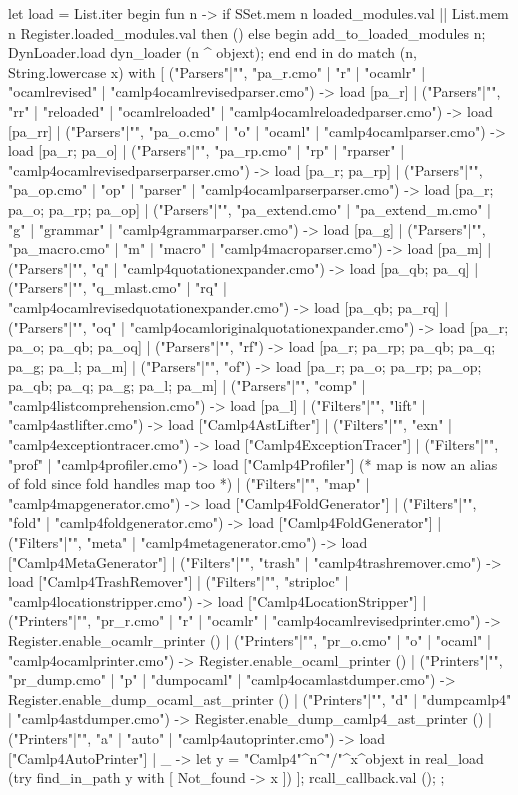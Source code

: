 \begin{ocamlcode}
  let load = List.iter begin fun n ->
    if SSet.mem n loaded_modules.val || List.mem n Register.loaded_modules.val then ()
    else begin
      add_to_loaded_modules n;
      DynLoader.load dyn_loader (n ^ objext);
    end
  end in
  do {
    match (n, String.lowercase x) with
    [ ("Parsers"|"", "pa_r.cmo"      | "r"  | "ocamlr" | "ocamlrevised" | "camlp4ocamlrevisedparser.cmo") -> load [pa_r]
    | ("Parsers"|"", "rr" | "reloaded" | "ocamlreloaded" | "camlp4ocamlreloadedparser.cmo") -> load [pa_rr]
    | ("Parsers"|"", "pa_o.cmo"      | "o"  | "ocaml" | "camlp4ocamlparser.cmo") -> load [pa_r; pa_o]
    | ("Parsers"|"", "pa_rp.cmo"     | "rp" | "rparser" | "camlp4ocamlrevisedparserparser.cmo") -> load [pa_r; pa_rp]
    | ("Parsers"|"", "pa_op.cmo"     | "op" | "parser" | "camlp4ocamlparserparser.cmo") -> load [pa_r; pa_o; pa_rp; pa_op]
    | ("Parsers"|"", "pa_extend.cmo" | "pa_extend_m.cmo" | "g" | "grammar" | "camlp4grammarparser.cmo") -> load [pa_g]
    | ("Parsers"|"", "pa_macro.cmo"  | "m"  | "macro" | "camlp4macroparser.cmo") -> load [pa_m]
    | ("Parsers"|"", "q" | "camlp4quotationexpander.cmo") -> load [pa_qb; pa_q]
    | ("Parsers"|"", "q_mlast.cmo" | "rq" | "camlp4ocamlrevisedquotationexpander.cmo") -> load [pa_qb; pa_rq]
    | ("Parsers"|"", "oq" | "camlp4ocamloriginalquotationexpander.cmo") -> load [pa_r; pa_o; pa_qb; pa_oq]
    | ("Parsers"|"", "rf") -> load [pa_r; pa_rp; pa_qb; pa_q; pa_g; pa_l; pa_m]
    | ("Parsers"|"", "of") -> load [pa_r; pa_o; pa_rp; pa_op; pa_qb; pa_q; pa_g; pa_l; pa_m]
    | ("Parsers"|"", "comp" | "camlp4listcomprehension.cmo") -> load [pa_l]
    | ("Filters"|"", "lift" | "camlp4astlifter.cmo") -> load ["Camlp4AstLifter"]
    | ("Filters"|"", "exn" | "camlp4exceptiontracer.cmo") -> load ["Camlp4ExceptionTracer"]
    | ("Filters"|"", "prof" | "camlp4profiler.cmo") -> load ["Camlp4Profiler"]
    (* map is now an alias of fold since fold handles map too *)
    | ("Filters"|"", "map" | "camlp4mapgenerator.cmo") -> load ["Camlp4FoldGenerator"]
    | ("Filters"|"", "fold" | "camlp4foldgenerator.cmo") -> load ["Camlp4FoldGenerator"]
    | ("Filters"|"", "meta" | "camlp4metagenerator.cmo") -> load ["Camlp4MetaGenerator"]
    | ("Filters"|"", "trash" | "camlp4trashremover.cmo") -> load ["Camlp4TrashRemover"]
    | ("Filters"|"", "striploc" | "camlp4locationstripper.cmo") -> load ["Camlp4LocationStripper"]
    | ("Printers"|"", "pr_r.cmo" | "r" | "ocamlr" | "camlp4ocamlrevisedprinter.cmo") ->
        Register.enable_ocamlr_printer ()
    | ("Printers"|"", "pr_o.cmo" | "o" | "ocaml" | "camlp4ocamlprinter.cmo") ->
        Register.enable_ocaml_printer ()
    | ("Printers"|"", "pr_dump.cmo" | "p" | "dumpocaml" | "camlp4ocamlastdumper.cmo") ->
        Register.enable_dump_ocaml_ast_printer ()
    | ("Printers"|"", "d" | "dumpcamlp4" | "camlp4astdumper.cmo") ->
        Register.enable_dump_camlp4_ast_printer ()
    | ("Printers"|"", "a" | "auto" | "camlp4autoprinter.cmo") ->
        load ["Camlp4AutoPrinter"]
    | _ ->
      let y = "Camlp4"^n^"/"^x^objext in
      real_load (try find_in_path y with [ Not_found -> x ]) ];
    rcall_callback.val ();
  };
\end{ocamlcode}

